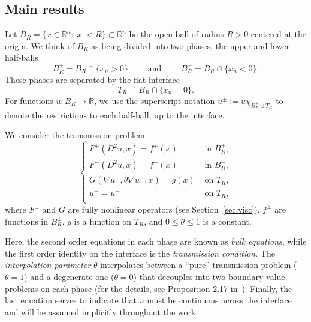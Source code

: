 \documentclass[letter,11pt]{amsart}
\newcommand{\R}{\mathbb{R}}
\newcommand{\chara}[1]{\chi_{#1}}
\theoremstyle{definition}
\numberwithin{equation}{section}
\begin{document}
\medskip

\subsection{Main results}

Let $B_R = \{x \in \R^n \colon |x| < R\} \subset \R^{n}$ be the open ball of radius $R > 0$ centered at the origin.
We think of $B_R$ as being divided into two phases, the upper and lower half-balls
\[
B_{R}^{+} = B_R \cap \{x_n > 0\}\qquad \text{ and } \qquad B_{R}^{-} = B_R \cap \{x_n < 0\}.
\]
These phases are separated by the flat interface
\[
T_R = B_R \cap \{x_n = 0\}.
\]
For functions $u \colon B_R \to \R$, we use the superscript notation $u^{\pm} := u \chara{B_R^{\pm} \cup T_R}$ to denote the restrictions to each half-ball, up to the interface.

\medskip

We consider the transmission problem
\[
\begin{cases}
F^{+}(D^2 u, x ) = f^{+}(x) & \text{ in } B_R^{+},\\
F^{-}(D^2 u, x ) = f^{-}(x) & \text{ in } B_R^{-},\\
G(\nabla u^{+}, \theta \nabla u^{-}, x) =g(x) & \text{ on } T_R,\\
u^{+} = u^{-} & \text{ on } T_R,\\
\end{cases}
\]
where $F^{\pm}$ and $G$ are fully nonlinear operators (see Section~\ref{sec:visc}), $f^{\pm}$ are functions in $B_R^{\pm}$, $g$ is a function on $T_R$, and $0 \leq \theta \leq 1$ is a constant.

\medskip

Here, the second order equations in each phase are known as \emph{bulk equations}, while the first order identity on the interface is the \emph{transmission condition}.
The \emph{interpolation parameter} $\theta$
interpolates between a ``pure'' transmission problem ($\theta = 1$) and a degenerate one ($\theta = 0$) that decouples into two boundary-value problems on each phase (for the details, see Proposition 2.17 in~\cite{E}).
Finally, the last equation serves to indicate that $u$ must be continuous across the interface and will be assumed implicitly throughout the work.

\medskip
\end{document}
